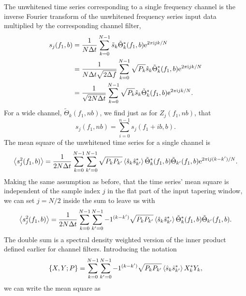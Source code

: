 \documentclass[10pt]{article}
\begin{document}
The unwhitened time series corresponding to a single frequency channel is
the inverse Fourier transform of the unwhitened frequency series input data
multiplied by the corresponding channel filter,
\begin{align}
s_{j}(f_{1}, b)
   & = \frac{1}{N \Delta t} \sum_{k = 0}^{N - 1} \tilde{s}_{k}
   \tilde{\Theta}^{*}_{k}(f_{1}, b) \mathrm{e}^{2 \pi \mathrm{i} j k / N}
   \\
   & = \frac{1}{N \Delta t \sqrt{2 \Delta f}} \sum_{k = 0}^{N - 1}
   \sqrt{P_{k}} \hat{s}_{k} \tilde{\Theta}^{*}_{k}(f_{1}, b) \mathrm{e}^{2 \pi
   \mathrm{i} j k / N}
   \\
\label{eqn7}
   & = \frac{1}{\sqrt{2 N \Delta t}} \sum_{k = 0}^{N - 1} \sqrt{P_{k}}
   \hat{s}_{k} \tilde{\Theta}^{*}_{k}(f_{1}, b) \mathrm{e}^{2 \pi \mathrm{i} j k /
   N}.
\end{align}
For a wide channel, \(\tilde{\Theta}_{k}(f_{1}, n b)\), we find just as for
\(Z_{j}(f_{1}, n b)\), that
\begin{equation}
s_{j}(f_{1}, n b)
   = \sum_{i = 0}^{n - 1} s_{j}(f_{1} + i b, b).
\end{equation}
The mean square of the unwhitened time series for a single channel is
\begin{equation}
\left\langle s_{j}^{2}(f_{1}, b)\right\rangle
   = \frac{1}{2 N \Delta t} \sum_{k = 0}^{N - 1} \sum_{k' = 0}^{N - 1}
   \sqrt{P_{k} P_{k'}} \left\langle\hat{s}_{k} \hat{s}^{*}_{k'}\right\rangle
   \tilde{\Theta}^{*}_{k}(f_{1}, b) \tilde{\Theta}_{k'}(f_{1}, b)
   \mathrm{e}^{2 \pi \mathrm{i} j (k - k') / N}.
\end{equation}
Making the same assumption as before, that the time series' mean square is
independent of the sample index \(j\) in the flat part of the input
tapering window, we can set \(j = N / 2\) inside the sum to leave us with
\begin{equation}
\left\langle s_{j}^{2}(f_{1}, b)\right\rangle
   = \frac{1}{2 N \Delta t} \sum_{k = 0}^{N - 1} \sum_{k' = 0}^{N - 1}
   -1^{(k - k')} \sqrt{P_{k} P_{k'}} \left\langle\hat{s}_{k} \hat{s}^{*}_{k'}\right\rangle
   \tilde{\Theta}^{*}_{k}(f_{1}, b) \tilde{\Theta}_{k'}(f_{1}, b).
\end{equation}
The double sum is a spectral density weighted version of the inner product
defined earlier for channel filters.  Introducing the notation
\begin{equation}
\left\{ X, Y; P \right\}
   = \sum_{k = 0}^{N - 1} \sum_{k' = 0}^{N - 1} -1^{(k - k')} \sqrt{P_{k}
   P_{k'}} \left\langle\hat{s}_{k} \hat{s}^{*}_{k'}\right\rangle X^{*}_{k} Y_{k},
\end{equation}
we can write the mean square as
\end{document}
